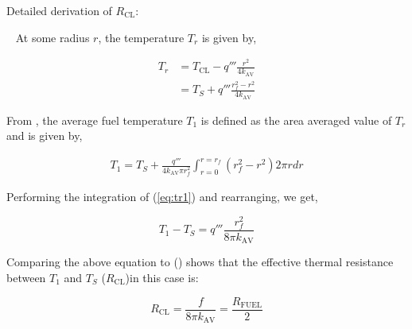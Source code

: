 \begin{bf}
Detailed derivation of $R_{\text{CL}}$:
\end{bf}

~\newline
At some radius $r$, the temperature $T_r$ is given by,

\begin{align}
T_r&=T_{\mathrm{CL}}- q'''\frac{r^2}{4k_{\mathrm{AV}}} \\
&=T_S+q'''\frac{r_f^2-r^2}{4k_{\mathrm{AV}}} \label{eq:tr}
\end{align}

From , the average fuel temperature $T_1$ is defined as
the area averaged value of $T_r$ and is given by,

\begin{align}
T_1=T_S+\frac{q'''}{4k_{\mathrm{AV}}\pi r_f^2}\int_{r=0}^{r=r_f}( r_f^2-r^2) 2\pi r dr\label{eq:tr1}
\end{align}

Performing the integration of (\ref{eq:tr1}) and rearranging, we get,

\begin{equation}
{T_1} -{T_S}=q'''\frac{r_f^2}{8\pi k_{\mathrm{AV}}} \label{eq:tr2}
\end{equation}

Comparing the above equation to () shows that the
effective thermal resistance between $T_1$ and $T_S$ ($R_{\text{CL}}$)in this
case is:

\begin{equation}
R_{\text{CL}}=\frac {f}{8 \pi k_{\mathrm{AV}}}= \frac{R_{\mathrm{FUEL}}}{2}
\end{equation}


